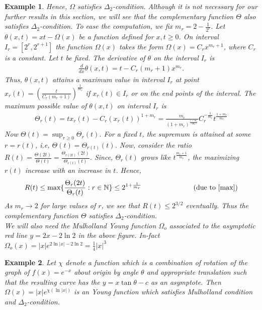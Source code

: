 \documentclass[pdflatex,sn-mathphys-num]{sn-jnl}%
\theoremstyle{thmstyleone}%
\theoremstyle{thmstyletwo}%
\newtheorem{example}{Example}%
\theoremstyle{thmstylethree}%
\begin{document}
\begin{example}
		Hence, $\Omega$ satisfies $\Delta_2$-condition. Although it is not necessary for our further results in this section, we will see that the complementary function $\Theta$ also satisfies $\Delta_2$-condition. To ease the computation, we fix $m_r=2-\frac{1}{2^r}$. Let $\theta(x,t)=xt-\Omega(x)$ be a function defined for $x,t\geq 0$. On interval $I_r=[2^r,2^{r+1}]$ the function $\Omega(x)$ takes the form $\Omega(x)=C_rx^{m_r+1}$, where $C_r$ is a constant. Let $t$ be fixed. The derivative of $\theta$ on the interval $I_r$ is  
		\begin{align*}
			\frac{d}{dx}\theta(x,t)=t-C_r(m_{r}+1)x^{m_r}.
		\end{align*}
		Thus, $\theta(x,t)$ attains a maximum value in interval $I_r$ at point $x_r(t)=\left(\frac{t}{C_r(m_r+1)}\right)^{\frac{1}{m_r}}$ if $x_r(t)\in I_r$ or on the end points of the interval. The maximum possible value of $\theta(x,t)$ on interval $I_r$ is \begin{eqnarray}\label{max}\Theta_r(t)=tx_r(t)-C_r(x_r(t))^{1+m_r}=\frac{m_r}{(1+m_r)^{\frac{1+m_r}{m_r}}}C_r^{-\frac{1}{m_r}}t^{\frac{1+m_r}{m_r}}\end{eqnarray}
		Now $\Theta(t)=\sup_{r\geq 0}\Theta_r(t)$. For a fixed $t$, the supremum is attained at some $r=r(t)$, i.e, $\Theta(t)=\Theta_{r(t)}(t)$. Now, consider the ratio $R(t)=\frac{\Theta(2t)}{\Theta(t)}=\frac{\Theta_{r(2t)}(2t)}{\Theta_{r(t)}(t)}$. Since, $\Theta_r(t)$ grows like $t^{\frac{m_r+1}{m_r}}$, the maximizing $r(t)$ increase with an increase in $t$. Hence,$$R(t)\leq \max\{\frac{\Theta_r(2t)}{\Theta_r(t)}: r\in \mathbb N\}\leq 2^{1+\frac{1}{m_r}} ~~~~~~~~~~~~~~~~~~~~~~(\text{due to} ~\ref{max})$$
		As $m_r\to 2$ for large values of $r$, we see that $R(t)\leq 2^{3/2}$ eventually. Thus the complementary function $\Theta$ satisfies $\Delta_2$-condition.\\
		
		 We will also need the Mulholland Young function $\Omega_o$ associated to the asymptotic red line $y=2x-2\ln 2$ in the above figure. In-fact $\Omega_o(x)=|x|e^{2\ln |x|-2\ln2}=\frac{1}{4}|x|^3$
	\end{example}
	\begin{example}
		Let $\chi$ denote a function which is a combination of rotation of the graph of $f(x)=e^{-x}$ about origin by angle $\theta$ and appropriate translation such that the resulting curve has the  $y=x\tan\theta -c$ as an asymptote. Then $\Omega(x)=|x|e^{\chi(\ln |x|)}$ is an Young function which satisfies Mulholland condition and $\Delta_2$-condition.
	\end{example}
\end{document}
